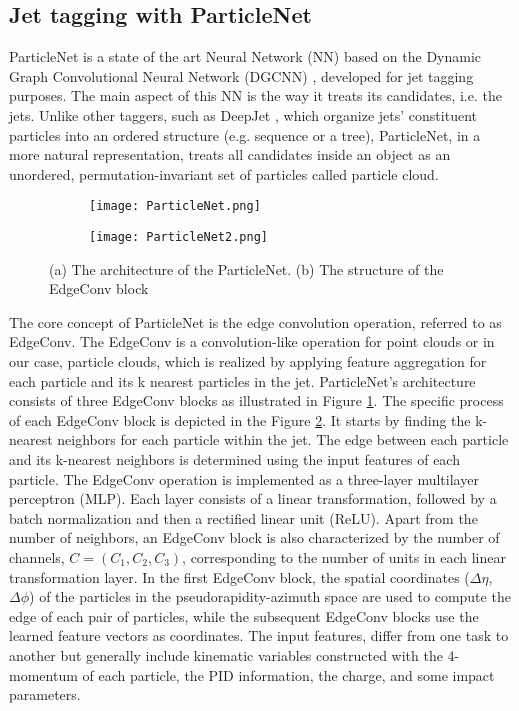 \subsection{\label{subsec:PNet}Jet tagging with ParticleNet}
\noindent ParticleNet is a state of the art Neural Network (NN) based on the Dynamic Graph Convolutional Neural Network (DGCNN) \cite{DGCNN}, developed for jet tagging purposes. The main aspect of this NN is the way it treats its candidates, i.e. the jets. Unlike other taggers, such as DeepJet \cite{DeepJet}, which organize jets' constituent particles into an ordered structure (e.g. sequence or  a tree), ParticleNet, in a more natural representation, treats all candidates inside an object as an unordered, permutation-invariant set of particles called particle cloud.
\begin{figure}[H]
    \centering
    \begin{subfigure}{0.45\textwidth}
        \centering
        \texttt{[image: ParticleNet.png]}
        \caption{}
        \label{subfig:PNet_architecture}
    \end{subfigure}
    \begin{subfigure}{0.45\textwidth}
        \centering
        \texttt{[image: ParticleNet2.png]}
        \caption{}
        \label{subfig:PNet_block}
    \end{subfigure}
    
    \caption{(a) The architecture of the ParticleNet. (b) The structure of the EdgeConv block \cite{ParticleNet}}
    \label{fig:PNet}
\end{figure}
\indent The core concept of ParticleNet is the edge convolution operation, referred to as EdgeConv. The EdgeConv is a convolution-like operation for point clouds or in our case, particle clouds, which is realized by applying feature aggregation for each particle and its k nearest particles in the jet. ParticleNet's architecture consists of three EdgeConv blocks as illustrated in Figure \ref{subfig:PNet_architecture}. The specific process of each EdgeConv block is depicted in the Figure \ref{subfig:PNet_block}. It starts by finding the k-nearest neighbors for each particle within the jet. The edge between each particle and its k-nearest neighbors is determined using the input features of each particle. The EdgeConv operation is implemented as a three-layer multilayer perceptron (MLP). Each layer consists of a linear transformation, followed by a batch normalization and then a rectified linear unit (ReLU). Apart from the number of neighbors, an EdgeConv block is also characterized by the number of channels, $C =(C_1,C_2,C_3)$, corresponding to the number of units in each linear transformation layer. In the first EdgeConv block, the spatial coordinates ($\Delta\eta$, $\Delta\phi$) of the particles in the pseudorapidity-azimuth space are used to compute the edge of each pair of particles, while the subsequent EdgeConv blocks use the learned feature vectors as coordinates. The input features, differ from one task to another but generally include kinematic variables constructed with the 4-momentum of each particle, the PID information, the charge, and some impact parameters.\\
